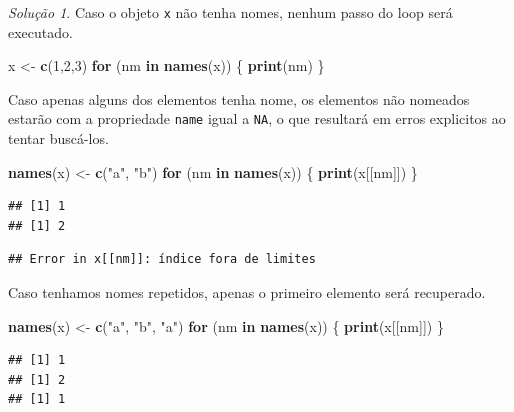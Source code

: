 \documentclass[
]{latex/krantz}
\newenvironment{Shaded}{\begin{snugshade}}{\end{snugshade}}
\newcommand{\ControlFlowTok}[1]{\textcolor[rgb]{0.13,0.29,0.53}{\textbf{#1}}}
\newcommand{\DecValTok}[1]{\textcolor[rgb]{0.00,0.00,0.81}{#1}}
\newcommand{\FunctionTok}[1]{\textcolor[rgb]{0.13,0.29,0.53}{\textbf{#1}}}
\newcommand{\NormalTok}[1]{#1}
\newcommand{\OtherTok}[1]{\textcolor[rgb]{0.56,0.35,0.01}{#1}}
\newcommand{\StringTok}[1]{\textcolor[rgb]{0.31,0.60,0.02}{#1}}
\theoremstyle{definition}
\theoremstyle{definition}
\theoremstyle{definition}
\theoremstyle{definition}
\theoremstyle{remark}
\newtheorem*{solution}{Solução}
\begin{document}
\begin{solution}

Caso o objeto \texttt{x} não tenha nomes, nenhum passo do loop será executado.

\begin{Shaded}
\begin{Highlighting}[]
\NormalTok{x }\OtherTok{\textless{}{-}} \FunctionTok{c}\NormalTok{(}\DecValTok{1}\NormalTok{,}\DecValTok{2}\NormalTok{,}\DecValTok{3}\NormalTok{)}
\ControlFlowTok{for}\NormalTok{ (nm }\ControlFlowTok{in} \FunctionTok{names}\NormalTok{(x)) \{}
  \FunctionTok{print}\NormalTok{(nm)}
\NormalTok{\}}
\end{Highlighting}
\end{Shaded}

Caso apenas alguns dos elementos tenha nome, os elementos não nomeados estarão com a propriedade \texttt{name} igual a \texttt{NA}, o que resultará em erros explicitos ao tentar buscá-los.

\begin{Shaded}
\begin{Highlighting}[]
\FunctionTok{names}\NormalTok{(x) }\OtherTok{\textless{}{-}} \FunctionTok{c}\NormalTok{(}\StringTok{"a"}\NormalTok{, }\StringTok{"b"}\NormalTok{)}
\ControlFlowTok{for}\NormalTok{ (nm }\ControlFlowTok{in} \FunctionTok{names}\NormalTok{(x)) \{}
  \FunctionTok{print}\NormalTok{(x[[nm]])}
\NormalTok{\}}
\end{Highlighting}
\end{Shaded}

\begin{verbatim}
## [1] 1
## [1] 2
\end{verbatim}

\begin{verbatim}
## Error in x[[nm]]: índice fora de limites
\end{verbatim}

Caso tenhamos nomes repetidos, apenas o primeiro elemento será recuperado.

\begin{Shaded}
\begin{Highlighting}[]
\FunctionTok{names}\NormalTok{(x) }\OtherTok{\textless{}{-}} \FunctionTok{c}\NormalTok{(}\StringTok{"a"}\NormalTok{, }\StringTok{"b"}\NormalTok{, }\StringTok{"a"}\NormalTok{)}
\ControlFlowTok{for}\NormalTok{ (nm }\ControlFlowTok{in} \FunctionTok{names}\NormalTok{(x)) \{}
  \FunctionTok{print}\NormalTok{(x[[nm]])}
\NormalTok{\}}
\end{Highlighting}
\end{Shaded}

\begin{verbatim}
## [1] 1
## [1] 2
## [1] 1
\end{verbatim}

\end{solution}
\end{document}
